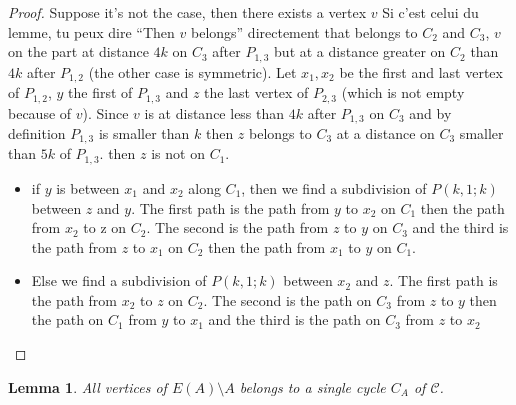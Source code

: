 \documentclass[utf8,10pt]{article}
\theoremstyle{plain}
\newtheorem{lemma}[theorem]{Lemma}
\theoremstyle{definition}
\theoremstyle{remark}
\newcommand{\nathann}[1]{{\color{blue}{\bf Nathann:} #1}}
\begin{document}
\begin{proof}
Suppose it's not the case, then there exists a vertex $v$ \nathann{Si c'est celui du lemme, tu peux dire ``Then $v$ belongs'' directement} that belongs to $C_2$ and $C_3$, $v$ on the part at distance $4k$ on $C_3$ after $P_{1,3}$
but at a distance greater on $C_2$ than $4k$ after $P_{1,2}$ (the other case is symmetric).
Let $x_1, x_2$ be the first and last vertex of $P_{1,2}$, $y$ the first of $P_{1,3}$ and $z$ the last vertex of $P_{2,3}$
(which is not empty because of $v$). Since $v$ is at distance less than $4k$ after $P_{1,3}$ on $C_3$ and by definition $P_{1,3}$
is smaller than $k$ then $z$ belongs to $C_3$ at a distance on $C_3$ smaller than $5k$ of $P_{1,3}$.
then $z$ is not on $C_1$.
\begin{itemize}
	\item if $y$ is between $x_1$ and $x_2$ along $C_1$, then we find a subdivision of $P(k,1;k)$
	between $z$ and $y$. The first path is the path from $y$ to $x_2$ on $C_1$ then the path from
	$x_2$ to z on $C_2$. The second is the path from $z$ to $y$ on $C_3$ and the third is the path
	from $z$ to $x_1$ on $C_2$ then the path from $x_1$ to $y$ on $C_1$.
	\item Else we find a subdivision of $P(k,1;k)$ between $x_2$ and $z$. The first path is the path from $x_2$
	to $z$ on $C_2$. The second is the path on $C_3$ from $z$ to $y$ then the path on $C_1$ from $y$ to $x_1$
	and the third is the path on $C_3$ from $z$ to $x_2$

\end{itemize}

\end{proof}


\begin{lemma}\label{A}
All vertices of $E(A) \setminus A$ belongs to a single cycle $C_A$ of $\mathcal{C}$.
\end{lemma}
\end{document}
